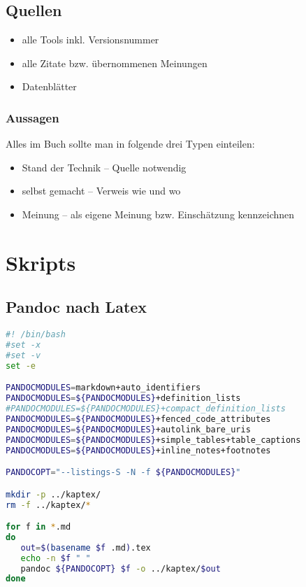 \hypertarget{quellen}{%
\subsection{Quellen}\label{quellen}}

\begin{itemize}
\tightlist
\item
  alle Tools inkl. Versionsnummer
\item
  alle Zitate bzw. übernommenen Meinungen
\item
  Datenblätter \ua
\end{itemize}

\hypertarget{aussagen}{%
\subsubsection{Aussagen}\label{aussagen}}

Alles im Buch sollte man in folgende drei Typen einteilen:

\begin{itemize}
\tightlist
\item
  Stand der Technik -- Quelle notwendig
\item
  selbst gemacht -- Verweis wie und wo
\item
  Meinung -- als eigene Meinung bzw. Einschätzung kennzeichnen
\end{itemize}

\hypertarget{skripts}{%
\section{Skripts}\label{skripts}}

\hypertarget{pandoc-nach-latex}{%
\subsection{Pandoc nach Latex}\label{pandoc-nach-latex}}

\begin{lstlisting}[language=bash]
#! /bin/bash
#set -x
#set -v
set -e

PANDOCMODULES=markdown+auto_identifiers
PANDOCMODULES=${PANDOCMODULES}+definition_lists
#PANDOCMODULES=${PANDOCMODULES}+compact_definition_lists
PANDOCMODULES=${PANDOCMODULES}+fenced_code_attributes
PANDOCMODULES=${PANDOCMODULES}+autolink_bare_uris
PANDOCMODULES=${PANDOCMODULES}+simple_tables+table_captions
PANDOCMODULES=${PANDOCMODULES}+inline_notes+footnotes

PANDOCOPT="--listings-S -N -f ${PANDOCMODULES}"

mkdir -p ../kaptex/
rm -f ../kaptex/*

for f in *.md
do
   out=$(basename $f .md).tex
   echo -n $f " "
   pandoc ${PANDOCOPT} $f -o ../kaptex/$out
done
\end{lstlisting}

